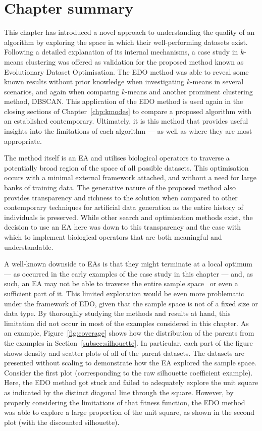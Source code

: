 
\section{Chapter summary}\label{sec:edo:summary}

This chapter has introduced a novel approach to understanding the quality of an
algorithm by exploring the space in which their well-performing datasets exist.
Following a detailed explanation of its internal mechanisms, a case study in
\(k\)-means clustering was offered as validation for the proposed method known
as Evolutionary Dataset Optimisation. The EDO method was able to reveal some
known results without prior knowledge when investigating \(k\)-means in several
scenarios, and again when comparing \(k\)-means and another prominent
clustering method, DBSCAN. This application of the EDO method is used again in
the closing sections of Chapter~\ref{chp:kmodes} to compare a proposed algorithm
with an established contemporary. Ultimately, it is this method that provides
useful insights into the limitations of each algorithm --- as well as where they
are most appropriate.

The method itself is an EA and utilises biological operators to traverse a
potentially broad region of the space of all possible datasets. This
optimisation occurs with a minimal external framework attached, and without a
need for large banks of training data. The generative nature of the proposed
method also provides transparency and richness to the solution when compared to
other contemporary techniques for artificial data generation as the entire
history of individuals is preserved. While other search and optimisation methods
exist, the decision to use an EA here was down to this transparency and the ease
with which to implement biological operators that are both meaningful and
understandable.

A well-known downside to EAs is that they might terminate at a local optimum ---
as occurred in the early examples of the case study in this chapter --- and, as
such, an EA may not be able to traverse the entire sample
space~\cite{Vikhar2016} or even a sufficient part of it. This limited
exploration would be even more problematic under the framework of EDO, given
that the sample space is not of a fixed size or data type. By thoroughly
studying the methods and results at hand, this limitation did not occur in
most of the examples considered in this chapter. As an example,
Figure~\ref{fig:coverage} shows how the distribution of the parents from the
examples in Section~\ref{subsec:silhouette}. In particular, each part of the
figure shows density and scatter plots of all of the parent datasets. The
datasets are presented without scaling to demonstrate how the EA explored the
sample space. Consider the first plot (corresponding to the raw silhouette
coefficient example). Here, the EDO method got stuck and failed to adequately
explore the unit square as indicated by the distinct diagonal line through the
square. However, by properly considering the limitations of that fitness
function, the EDO method was able to explore a large proportion of the unit
square, as shown in the second plot (with the discounted silhouette).

